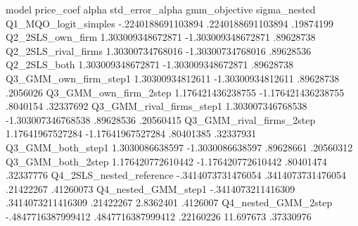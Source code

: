 model	price_coef	alpha	std_error_alpha	gmm_objective	sigma_nested
Q1_MQO_logit_simples	-.2240188691103894	.2240188691103894	.19874199		
Q2_2SLS_own_firm	1.303009348672871	-1.303009348672871	.89628738		
Q2_2SLS_rival_firms	1.30300734768016	-1.30300734768016	.89628536		
Q2_2SLS_both	1.303009348672871	-1.303009348672871	.89628738		
Q3_GMM_own_firm_step1	1.30300934812611	-1.30300934812611	.89628738	.2056026	
Q3_GMM_own_firm_2step	1.176421436238755	-1.176421436238755	.8040154	.32337692	
Q3_GMM_rival_firms_step1	1.303007346768538	-1.303007346768538	.89628536	.20560415	
Q3_GMM_rival_firms_2step	1.17641967527284	-1.17641967527284	.80401385	.32337931	
Q3_GMM_both_step1	1.3030086638597	-1.3030086638597	.89628661	.20560312	
Q3_GMM_both_2step	1.176420772610442	-1.176420772610442	.80401474	.32337776	
Q4_2SLS_nested_reference	-.3414073731476054	.3414073731476054	.21422267		.41260073
Q4_nested_GMM_step1	-.3414073211416309	.3414073211416309	.21422267	2.8362401	.4126007
Q4_nested_GMM_2step	-.4847716387999412	.4847716387999412	.22160226	11.697673	.37330976
